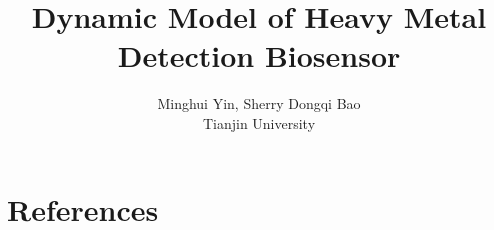 \documentclass[a4paper,10pt]{article}
\begin{document}
 
\title{Dynamic Model of Heavy Metal Detection Biosensor} \author{Minghui Yin, Sherry Dongqi Bao \\Tianjin University}
\maketitle 
\begin{abstract}
\end{abstract}




\section*{References}
\printbibliography
\end{document}
